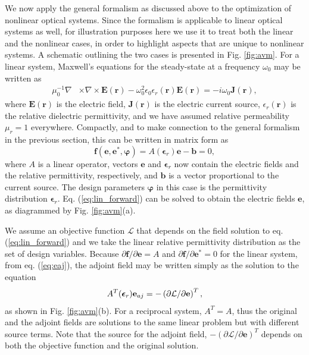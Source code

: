 We now apply the general formalism as discussed above to the  optimization of nonlinear optical systems. Since the formalism is applicable to linear optical systems as well, for illustration purposes here we use it to treat both the linear and the nonlinear cases, in order to highlight aspects that are unique to nonlinear systems.   A schematic outlining the two cases is presented in Fig. \ref{fig:avm}.  For a linear system, Maxwell's equations for the steady-state at a frequency $\omega_0$ may be written as 
%
\begin{align}
\mu_0^{-1}  \nabla &\times \nabla \times \mathbf{E}(\mathbf{r}) - \omega_0^2 \epsilon_0 \epsilon_r(\mathbf{r}) \mathbf{E}(\mathbf{r})  = -i \omega_0 \mathbf{J}(\mathbf{r}),
\label{eq:fdfd_lin}
\end{align}
where $\mathbf{E}(\mathbf{r})$ is the electric field, $\mathbf{J}(\mathbf{r})$ is the electric current source, $\epsilon_r(\mathbf{r})$ is the relative dielectric permittivity, and we have assumed relative permeability $\mu_r = 1$ everywhere. Compactly, and to make connection to the general formalism in the previous section, this can be written in matrix form as
%
\begin{equation}
\mathbf{f}(\mathbf{e}, \mathbf{e}^*, \bm{\varphi}) = A(\bm{\epsilon}_r) \mathbf{e} - \mathbf{b} = 0,
\label{eq:lin_forward}
\end{equation}
%
where $A$ is a linear operator, vectors $\mathbf{e}$ and $\bm{\epsilon}_r$ now contain the electric fields and the relative permittivity, respectively, and $\mathbf{b}$ is a vector proportional to the current source. The design parameters $\bm{\varphi}$ in this case is the permittivity distribution $\bm{\epsilon}_r$. Eq. (\ref{eq:lin_forward}) can be solved to obtain the electric fields $\mathbf{e}$, as diagrammed by Fig. \ref{fig:avm}(a).

We assume an objective function $\mathcal{L}$ that depends on the field solution to eq. (\ref{eq:lin_forward}) and we take the linear relative permittivity distribution as the set of design variables.  Because $\partial \mathbf{f} / \partial \mathbf{e} = A$ and $\partial \mathbf{f} / \partial \mathbf{e}^* = 0$ for the linear system, from eq. (\ref{eq:eaj}), the adjoint field may be written simply as the solution to the equation
%
\begin{equation}
A^T(\bm{\epsilon}_r) \mathbf{e}_{aj} = -\left( \partial \mathcal{L}/\partial \mathbf{e}\right)^T,
\end{equation}
%
as shown in Fig. \ref{fig:avm}(b).  For a reciprocal system, $A^T = A$, thus the original and the adjoint fields are solutions to the same linear problem but with different source terms. Note that the source for the adjoint field, $-\left( \partial \mathcal{L}/\partial \mathbf{e}\right)^T$ depends on both the objective function and the original solution. 

